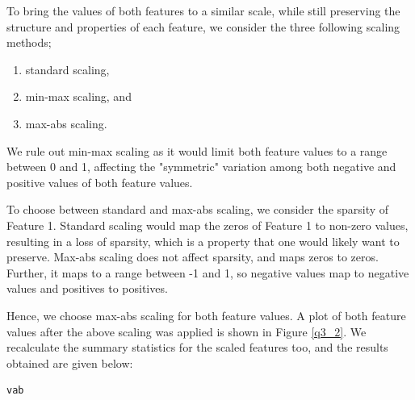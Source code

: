 \documentclass{article}[a4paper]
\begin{document}
	To bring the values of both features to a similar scale, while still preserving the structure and properties of
	each feature, we consider the three following scaling methods;
	\begin{enumerate}
		\item standard scaling,
		\item min-max scaling, and
		\item max-abs scaling.
	\end{enumerate}
	
	We rule out min-max scaling as it would limit both feature values to a range between 0 and 1, affecting the 
	"symmetric" variation among both negative and positive values of both feature values.

	To choose between standard and max-abs scaling, we consider the sparsity of Feature 1. Standard scaling would 
	map the zeros of Feature 1 to non-zero values, resulting in a loss of sparsity, which is a property that
	one would likely want to preserve. Max-abs scaling does not affect sparsity, and maps zeros to zeros. Further, it
	maps to a range between -1 and 1, so negative values map to negative values and positives to positives.

	Hence, we choose max-abs scaling for both feature values. A plot of both feature values after the above scaling
	was applied is shown in Figure \ref{q3_2}. We recalculate the summary statistics for the scaled features too, and
	the results obtained are given below:
	\begin{verbatim}
vab
	\end{verbatim}
\end{document}
